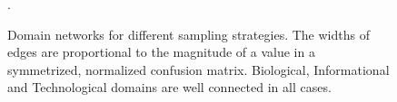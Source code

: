 \begin{figure}
\caption{Domain networks for different sampling strategies. The widths of edges are proportional to the magnitude of a value in a symmetrized, normalized confusion matrix. Biological, Informational and Technological domains are well connected in all cases.} \label{meta_network}.
\end{figure}

